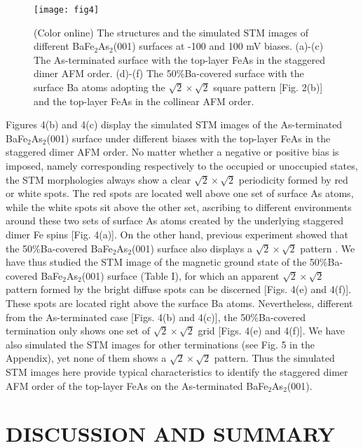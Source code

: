 \documentclass[twocolumn,aps,showpacs,prb]{revtex4-1}
\begin{document}
\begin{figure}[!t]
\texttt{[image: fig4]}
\caption{(Color online) The structures and the simulated STM images of different BaFe$_{2}$As$_{2}$(001) surfaces at -100 and 100 mV biases. (a)-(c) The As-terminated surface with the top-layer FeAs in the staggered dimer AFM order. (d)-(f) The 50\%Ba-covered surface with the surface Ba atoms adopting the $\sqrt{2}\times\sqrt{2}$ square pattern [Fig. 2(b)] and the top-layer FeAs in the collinear AFM order.}
\label{fig4}
\end{figure}

Figures 4(b) and 4(c) display the simulated STM images of the As-terminated BaFe$_{2}$As$_{2}$(001) surface under different biases with the top-layer FeAs in the staggered dimer AFM order. No matter whether a negative or positive bias is imposed, namely corresponding respectively to the occupied or unoccupied states, the STM morphologies always show a clear $\sqrt{2}\times\sqrt{2}$ periodicity formed by red or white spots. The red spots are located well above one set of surface As atoms, while the white spots sit above the other set, ascribing to different environments around these two sets of surface As atoms created by the underlying staggered dimer Fe spins [Fig. 4(a)]. On the other hand, previous experiment showed that the 50\%Ba-covered BaFe$_{2}$As$_{2}$(001) surface also displays a $\sqrt{2}\times\sqrt{2}$ pattern \cite{25HuiZhang(2010)PRB}. We have thus studied the STM image of the magnetic ground state of the 50\%Ba-covered BaFe$_{2}$As$_{2}$(001) surface (Table I), for which an apparent $\sqrt{2}\times\sqrt{2}$ pattern formed by the bright diffuse spots can be discerned [Figs. 4(e) and 4(f)]. These spots are located right above the surface Ba atoms. Nevertheless, different from the As-terminated case [Figs. 4(b) and 4(c)], the 50\%Ba-covered termination only shows one set of $\sqrt{2}\times\sqrt{2}$ grid [Figs. 4(e) and 4(f)]. We have also simulated the STM images for other terminations (see Fig. 5 in the Appendix), yet none of them shows a $\sqrt{2}\times\sqrt{2}$ pattern. Thus the simulated STM images here provide typical characteristics to identify the staggered dimer AFM order of the top-layer FeAs on the As-terminated BaFe$_{2}$As$_{2}$(001).


\section{DISCUSSION AND SUMMARY}
\end{document}
